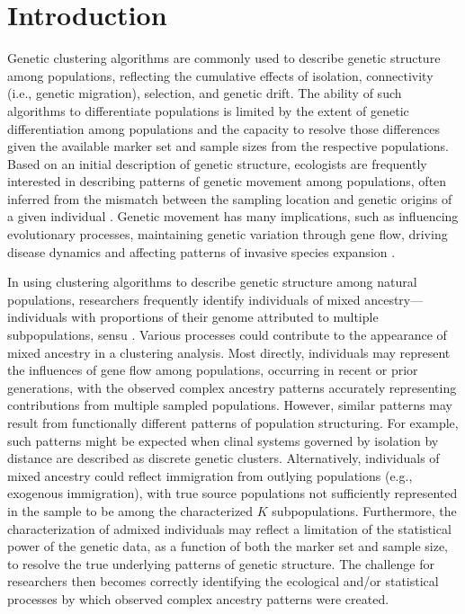 
\section*{Introduction}

Genetic clustering algorithms are commonly used to describe genetic structure among populations, reflecting the cumulative
effects of isolation, connectivity (i.e., genetic migration), selection, and genetic drift.  The ability of such algorithms to differentiate populations
is limited by the extent of genetic differentiation among populations and the capacity to resolve those differences given the available marker
set and sample sizes from the respective populations.  Based on an initial description of genetic structure, ecologists are frequently
interested in describing patterns of genetic movement among populations, often inferred from the mismatch between the sampling location
and genetic origins of a given individual \citep{paetkau1995microsatellite,wilson2003bayesian}.  Genetic movement has many implications,
such as influencing evolutionary processes, maintaining genetic variation through gene flow, driving disease dynamics and affecting patterns
of invasive species expansion \citep{huestis2019windborne, estoup2010reconstructing}.

In using clustering algorithms to describe genetic structure among natural populations, researchers frequently identify individuals of
mixed ancestry---individuals with proportions of their genome attributed to multiple subpopulations, sensu \citet{pritchard2000inference}.
Various processes could contribute to the appearance of mixed ancestry in a clustering analysis.  Most directly, individuals may represent the
influences of gene flow among populations, occurring in recent or prior generations, with the observed complex ancestry patterns accurately
representing contributions from multiple sampled populations.  However, similar patterns may result from functionally different patterns of
population structuring.  For example, such patterns might be expected when clinal systems governed by isolation by distance are described
as discrete genetic clusters.
Alternatively, individuals of mixed ancestry could reflect immigration from outlying populations (e.g., exogenous immigration), with true source
populations not sufficiently
represented in the sample to be among the characterized $K$ subpopulations.
Furthermore, the characterization of admixed individuals may reflect a limitation of the statistical power of the genetic data,
as a function of both the marker set and sample size, to resolve the true underlying patterns of genetic structure.
 The challenge for researchers then becomes correctly identifying the ecological and/or statistical processes by which observed complex
 ancestry patterns were created.

